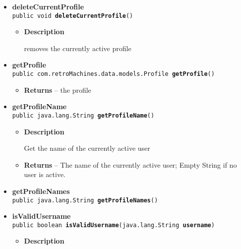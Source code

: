 \documentclass[11pt,a4paper]{report}
\begin{document}
{{{{{{{{{{{{{{{{{{{\begin{itemize}
{\begin{itemize}
{changes to the current profile to another profile
}
\item{
{\bf  Parameters}
  \begin{itemize}
   \item{
\texttt{profileName} -- the name of the profile}
  \end{itemize}
}%
\end{itemize}
}%
\item{ 
{\bf  deleteCurrentProfile}\\
\texttt{public void\ {\bf  deleteCurrentProfile}()
\label{com.retroMachines.game.controllers.ProfileController.deleteCurrentProfile()}}%
\begin{itemize}
\item{
{\bf  Description}

removes the currently active profile
}
\end{itemize}
}%
\item{ 
{\bf  getProfile}\\
\texttt{public com.retroMachines.data.models.Profile\ {\bf  getProfile}()
\label{com.retroMachines.game.controllers.ProfileController.getProfile()}}%
\begin{itemize}
\item{{\bf  Returns} -- 
the profile 
}%
\end{itemize}
}%
\item{ 
{\bf  getProfileName}\\
\texttt{public java.lang.String\ {\bf  getProfileName}()
\label{com.retroMachines.game.controllers.ProfileController.getProfileName()}}%
\begin{itemize}
\item{
{\bf  Description}

Get the name of the currently active user
}
\item{{\bf  Returns} -- 
The name of the currently active user; Empty String if no user is active. 
}%
\end{itemize}
}%
\item{ 
{\bf  getProfileNames}\\
\texttt{public java.lang.String\lbrack \rbrack \ {\bf  getProfileNames}()
\label{com.retroMachines.game.controllers.ProfileController.getProfileNames()}}%
}%
\item{ 
{\bf  isValidUsername}\\
\texttt{public boolean\ {\bf  isValidUsername}(\texttt{java.lang.String} {\bf  username})
\label{com.retroMachines.game.controllers.ProfileController.isValidUsername(java.lang.String)}}%
\begin{itemize}
\item{
{\bf  Description}

}
\end{itemize}}
\end{itemize}}}}}}}}}}}}}}}}}}}}
\end{document}
